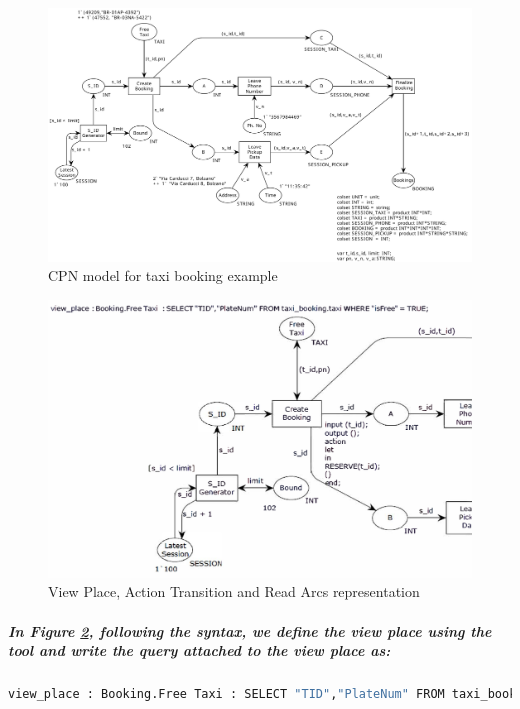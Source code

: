 \begin{figure}[!htbp]
	\centering
	\includegraphics[scale = 0.35]{DBN_Impl_CPN_Taxi_Booking.pdf}
	\caption{CPN model for taxi booking example}
	\label{fig:DBN_Impl_CPN_Taxi_Booking}
\end{figure}

\begin{figure}[!htbp]
	\centering
	\includegraphics[scale = 0.60]{DBN_Impl_Control_Layer.pdf}
	\caption{View Place, Action Transition and Read Arcs representation}
	\label{fig:DBN_Impl_Control_Layer}
\end{figure}

\subparagraph*{\textnormal{In Figure \ref{fig:DBN_Impl_Control_Layer}, following the syntax, we define the view place using the  tool and write the query attached to the view place as:}}

\subparagraph*{}
\begin{lstlisting}[showstringspaces=false, language = ML, caption = View place definition: $\mathit{Free\ Taxi}$, captionpos=b]
view_place : Booking.Free Taxi : SELECT "TID","PlateNum" FROM taxi_booking.taxi WHERE "isFree" = TRUE;
\end{lstlisting}

